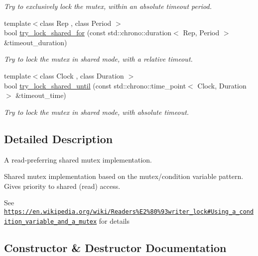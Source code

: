 \begin{DoxyCompactItemize}
\begin{DoxyCompactList}\small\item\em Try to exclusively lock the mutex, within an absolute timeout period. \end{DoxyCompactList}\item 
{\footnotesize template$<$class Rep , class Period $>$ }\\bool \hyperlink{classcpen333_1_1thread_1_1impl_1_1shared__mutex__shared_a12d65f5e71f62d44ca910a1bf8831f13}{try\+\_\+lock\+\_\+shared\+\_\+for} (const std\+::chrono\+::duration$<$ Rep, Period $>$ \&timeout\+\_\+duration)
\begin{DoxyCompactList}\small\item\em Try to lock the mutex in shared mode, with a relative timeout. \end{DoxyCompactList}\item 
{\footnotesize template$<$class Clock , class Duration $>$ }\\bool \hyperlink{classcpen333_1_1thread_1_1impl_1_1shared__mutex__shared_a2e55208ed6d24f5ff3112998ff2f50c5}{try\+\_\+lock\+\_\+shared\+\_\+until} (const std\+::chrono\+::time\+\_\+point$<$ Clock, Duration $>$ \&timeout\+\_\+time)
\begin{DoxyCompactList}\small\item\em Try to lock the mutex in shared mode, with absolute timeout. \end{DoxyCompactList}\end{DoxyCompactItemize}


\subsection{Detailed Description}
A read-\/preferring shared mutex implementation. 

Shared mutex implementation based on the mutex/condition variable pattern. Gives priority to shared (read) access.

See \href{https://en.wikipedia.org/wiki/Readers%E2%80%93writer_lock#Using_a_condition_variable_and_a_mutex}{\tt https\+://en.\+wikipedia.\+org/wiki/\+Readers\%\+E2\%80\%93writer\+\_\+lock\#\+Using\+\_\+a\+\_\+condition\+\_\+variable\+\_\+and\+\_\+a\+\_\+mutex} for details 

\subsection{Constructor \& Destructor Documentation}
\mbox{\label{classcpen333_1_1thread_1_1impl_1_1shared__mutex__shared_a36db88415158bfa99efca5b8bbc70533}} 
